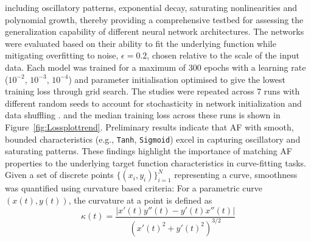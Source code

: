 \documentclass{article}
\begin{document}
including oscillatory patterns, exponential decay, saturating nonlinearities 
and polynomial growth, thereby providing a comprehensive testbed for assessing the 
generalization capability of different neural network architectures. 
The networks were evaluated based on their ability to fit the underlying 
function while mitigating overfitting to noise, $\epsilon = 0.2$, chosen relative to the scale of the input data. Each model was trained for 
a maximum of 300 epochs with a learning rate ($10^{-2}$, $10^{-3}$, $10^{-4}$) and parameter initialisation 
optimised to give the lowest training loss through grid search.
The studies were repeated across 7 runs with different random seeds to 
account for stochasticity in network initialization and data shuffling \cite{Dushatskiy_2022}.
and the median training loss across these runs is shown in 
Figure~\ref{fig:Lossplottrend}.
Preliminary results indicate that AF with smooth, bounded characteristics 
(e.g., \texttt{Tanh}, \texttt{Sigmoid}) excel in capturing oscillatory 
and saturating patterns.
These findings highlight the importance of matching AF properties 
to the underlying target function characteristics in curve-fitting tasks.
Given a set of discrete points $\{(x_i, y_i)\}_{i=1}^N$ representing a curve, 
smoothness was quantified using curvature based criteria:
For a parametric curve $(x(t), y(t))$, the curvature at a point is defined as
\begin{equation}
\kappa(t) = \frac{|x'(t)y''(t) - y'(t)x''(t)|}{\left( x'(t)^2 + y'(t)^2 \right)^{3/2}}
\end{equation}
\end{document}
